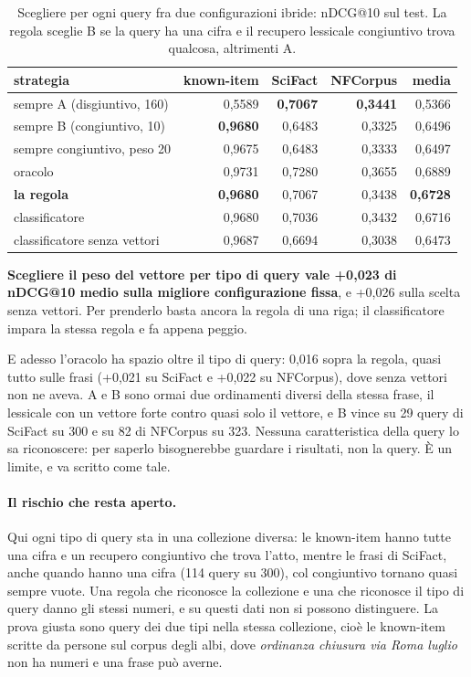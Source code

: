 \begin{table}[ht]
  \centering
  \small
  \begin{tabular}{lrrrr}
    \toprule
    strategia & known-item & SciFact & NFCorpus & media \\
    \midrule
    sempre A (disgiuntivo, 160) & 0,5589 & \textbf{0,7067} & \textbf{0,3441} & 0,5366 \\
    sempre B (congiuntivo, 10) & \textbf{0,9680} & 0,6483 & 0,3325 & 0,6496 \\
    sempre congiuntivo, peso 20 & 0,9675 & 0,6483 & 0,3333 & 0,6497 \\
    oracolo & 0,9731 & 0,7280 & 0,3655 & 0,6889 \\
    \textbf{la regola} & \textbf{0,9680} & 0,7067 & 0,3438 & \textbf{0,6728} \\
    classificatore & 0,9680 & 0,7036 & 0,3432 & 0,6716 \\
    \midrule
    classificatore senza vettori & 0,9687 & 0,6694 & 0,3038 & 0,6473 \\
    \bottomrule
  \end{tabular}
  \caption{Scegliere per ogni query fra due configurazioni ibride: nDCG@10 sul
  test. La regola sceglie B se la query ha una cifra e il recupero lessicale
  congiuntivo trova qualcosa, altrimenti A.}
  \label{tab:scelta}
\end{table}

\textbf{Scegliere il peso del vettore per tipo di query vale +0,023 di \mbox{nDCG@10} medio
sulla migliore configurazione fissa}, e +0,026 sulla scelta senza vettori. Per
prenderlo basta ancora la regola di una riga; il classificatore impara la stessa
regola e fa appena peggio.

E adesso l'oracolo ha spazio oltre il tipo di query: 0,016 sopra la regola, quasi
tutto sulle frasi (+0,021 su SciFact e +0,022 su NFCorpus), dove senza vettori non ne
aveva. A e B sono ormai due ordinamenti diversi della stessa frase, il lessicale con
un vettore forte contro quasi solo il vettore, e B vince su 29 query di SciFact su
300 e su 82 di NFCorpus su 323. Nessuna caratteristica della query lo sa
riconoscere: per saperlo bisognerebbe guardare i risultati, non la query. È un
limite, e va scritto come tale.

\paragraph{Il rischio che resta aperto.} Qui ogni tipo di query sta in una collezione
diversa: le known-item hanno tutte una cifra e un recupero congiuntivo che trova
l'atto, mentre le frasi di SciFact, anche quando hanno una cifra (114 query su
300), col congiuntivo tornano quasi sempre vuote. Una regola che riconosce la collezione e una che riconosce il tipo
di query danno gli stessi numeri, e su questi dati non si possono distinguere. La
prova giusta sono query dei due tipi nella stessa collezione, cioè le known-item
scritte da persone sul corpus degli albi, dove \emph{ordinanza chiusura via Roma
luglio} non ha numeri e una frase può averne.

